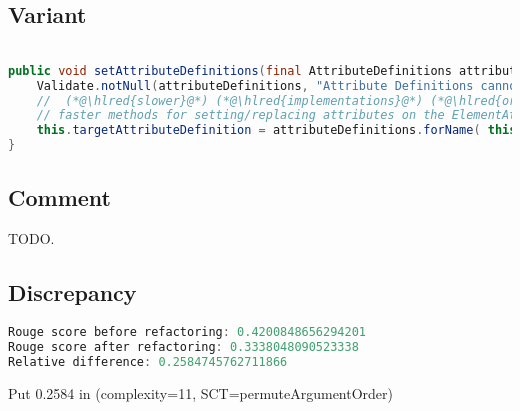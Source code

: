 \documentclass[11pt]{article}
\DeclareRobustCommand{\hlred}[1]{{\sethlcolor{YellowOrange}\hl{#1}}}
\begin{document}
  \subsection{Variant}

  \begin{lstlisting}[language=java]

public void setAttributeDefinitions(final AttributeDefinitions attributeDefinitions) {
    Validate.notNull(attributeDefinitions, "Attribute Definitions cannot be null");
    //  (*@\hlred{slower}@*) (*@\hlred{implementations}@*) (*@\hlred{or}@*) (*@\hlred{also}@*) (*@\hlred{other}@*) (*@\hlred{slower}@*) (*@\hlred{or}@*) (*@\hlred{equivalent}@*) (*@\hlred{methods}@*) (*@\hlred{are}@*) (*@\hlred{encouraged}@*) (*@\hlred{and}@*) (*@\hlred{can}@*) (*@\hlred{instead}@*) (*@\hlred{invoke}@*) (*@\hlred{only}@*)
    // faster methods for setting/replacing attributes on the ElementAttributes implementation
    this.targetAttributeDefinition = attributeDefinitions.forName( this.targetAttrCompleteName(*@\hlred{,getTemplateMode(}@*))(*@\hlred{)}@*);
}
  \end{lstlisting}

  \subsection{Comment}

  TODO.

  \subsection{Discrepancy}

  \begin{lstlisting}[language=java]
Rouge score before refactoring: 0.4200848656294201
Rouge score after refactoring: 0.3338048090523338
Relative difference: 0.2584745762711866
  \end{lstlisting}

  Put 0.2584 in (complexity=11, SCT=permuteArgumentOrder)
\end{document}

